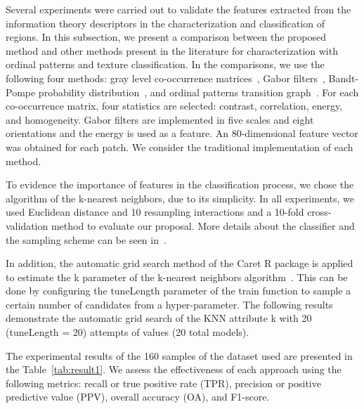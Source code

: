 \documentclass[journal]{IEEEtran}
\begin{document}
Several experiments were carried out to validate the features extracted from the information theory descriptors in the characterization and classification of regions.
In this subsection, we present a comparison between the proposed method and other methods present in the literature for characterization with ordinal patterns and texture classification.
In the comparisons, we use the following four methods: gray level co-occurrence matrices~\cite{kourgli2012texture}, Gabor filters~\cite{weldon1996efficient}, Bandt-Pompe probability distribution~\cite{Bandt2002Permutation}, and ordinal patterns transition graph~\cite{borges2019learning}.
For each co-occurrence matrix, four statistics are selected: contrast, correlation, energy, and homogeneity.
Gabor filters are implemented in five scales and eight orientations and the energy is used as a feature. 
An 80-dimensional feature vector was obtained for each patch.
We consider the traditional implementation of each method.

To evidence the importance of features in the classification process, we chose the algorithm of the k-nearest neighbors, due to its simplicity.
In all experiments, we used Euclidean distance and 10 resampling interactions and a 10-fold cross-validation method to evaluate our proposal.
More details about the classifier and the sampling scheme can be seen in~\cite{mitchell1997machine}. 

In addition, the automatic grid search method of the Caret R package is applied to estimate the k parameter of the k-nearest neighbors algorithm~\cite{kuhn2008building}.
This can be done by configuring the tuneLength parameter of the train function to sample a certain number of candidates from a hyper-parameter.
The following results demonstrate the automatic grid search of the KNN attribute k with 20 (tuneLength = 20) attempts of values (20 total models).

The experimental results of the 160 samples of the dataset used are presented in the Table~\ref{tab:result1}.
We assess the effectiveness of each approach using the following metrics: recall or true positive rate (TPR), precision or positive predictive value (PPV), overall accuracy (OA), and F1-score.
\end{document}
